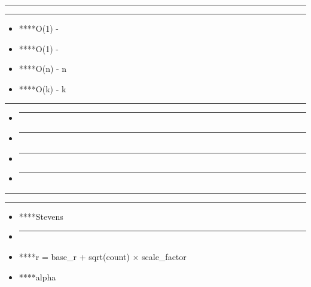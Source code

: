 \begin{center}\rule{0.5\linewidth}{0.5pt}\end{center}

\begin{center}\rule{0.5\linewidth}{0.5pt}\end{center}

\begin{itemize}
\tightlist
\item
  ****O(1) -
\item
  ****O(1) -
\item
  ****O(n) - n
\item
  ****O(k) - k
\end{itemize}

\begin{center}\rule{0.5\linewidth}{0.5pt}\end{center}

\begin{itemize}
\item
  \begin{center}\rule{0.5\linewidth}{0.5pt}\end{center}
\item
  \begin{center}\rule{0.5\linewidth}{0.5pt}\end{center}
\item
  \begin{center}\rule{0.5\linewidth}{0.5pt}\end{center}
\item
  \begin{center}\rule{0.5\linewidth}{0.5pt}\end{center}
\end{itemize}

\begin{center}\rule{0.5\linewidth}{0.5pt}\end{center}

\begin{center}\rule{0.5\linewidth}{0.5pt}\end{center}

\begin{itemize}
\item
  ****Stevens
\item
  \begin{center}\rule{0.5\linewidth}{0.5pt}\end{center}
\item
  ****r = base\_r + sqrt(count) × scale\_factor
\item
  ****alpha
\end{itemize}

